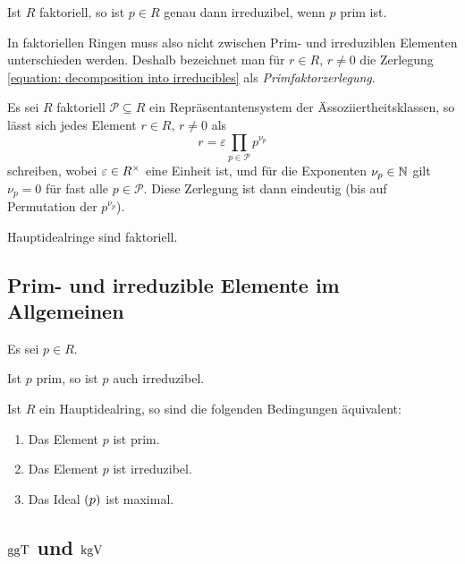 \begin{lemma}
  Ist $R$ faktoriell, so ist $p \in R$ genau dann irreduzibel, wenn $p$ prim ist.
\end{lemma}

In faktoriellen Ringen muss also nicht zwischen Prim- und irreduziblen Elementen unterschieden werden.
Deshalb bezeichnet man für $r \in R$, $r \neq 0$ die Zerlegung \eqref{equation: decomposition into irreducibles} als \emph{Primfaktorzerlegung}.

\begin{remark}
  Es sei $R$ faktoriell $\mathcal{P} \subseteq R$ ein Repräsentantensystem der Ässoziiertheitsklassen, so lässt sich jedes Element $r \in R$, $r \neq 0$ als
  \[
    r = \varepsilon \prod_{p \in \mathcal{P}} p^{\nu_p}
  \]
  schreiben, wobei $\varepsilon \in R^{\times}$ eine Einheit ist, und für die Exponenten $\nu_p \in \mathbb{N}$ gilt $\nu_p = 0$ für fast alle $p \in \mathcal{P}$.
  Diese Zerlegung ist dann eindeutig (bis auf Permutation der $p^{\nu_p}$).
\end{remark}


\begin{proposition}
  Hauptidealringe sind faktoriell.
\end{proposition}



\subsection{Prim- und irreduzible Elemente im Allgemeinen}

Es sei $p \in R$.

\begin{lemma}
  Ist $p$ prim, so ist $p$ auch irreduzibel.
\end{lemma}

\begin{lemma}
  Ist $R$ ein Hauptidealring, so sind die folgenden Bedingungen äquivalent:
  \begin{enumerate}
    \item
      Das Element $p$ ist prim.
    \item
      Das Element $p$ ist irreduzibel.
    \item
      Das Ideal $(p)$ ist maximal.
  \end{enumerate}
\end{lemma}



\subsection{\texorpdfstring{$\operatorname{ggT}$}{ggT} und \texorpdfstring{$\operatorname{kgV}$}{kgV}}

